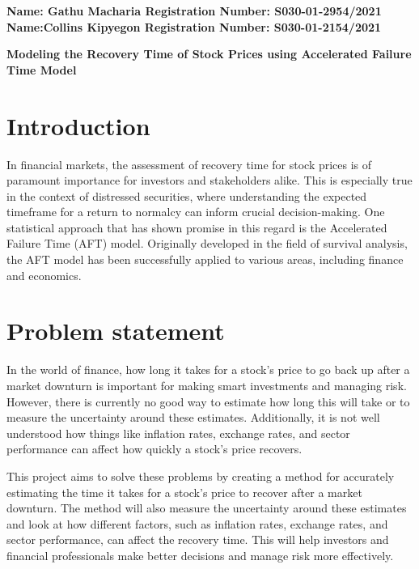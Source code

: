\documentclass[twoside,a4paper,12pt]{article}
\begin{document}
	
	\begin{flushleft} 
			\large{\bf{Name: Gathu Macharia     Registration Number: S030-01-2954/2021\\
					   Name:Collins Kipyegon        Registration Number: S030-01-2154/2021\\}} \vspace*{0.75in}
	\end{flushleft}
	
	\begin{center} \Large{ \bf{Modeling the Recovery Time of Stock Prices using Accelerated Failure Time Model }} \end{center}	


\section*{Introduction}In financial markets, the assessment of recovery time for stock prices is of paramount importance for investors and stakeholders alike. This is especially true in the context of distressed securities, where understanding the expected timeframe for a return to normalcy can inform crucial decision-making. One statistical approach that has shown promise in this regard is the Accelerated Failure Time (AFT) model. Originally developed in the field of survival analysis, the AFT model has been successfully applied to various areas, including finance and economics.

\section*{Problem statement}In the world of finance, how long it takes for a stock's price to go back up after a market downturn is important for making smart investments and managing risk. However, there is currently no good way to estimate how long this will take or to measure the uncertainty around these estimates. Additionally, it is not well understood how things like inflation rates, exchange rates, and sector performance can affect how quickly a stock's price recovers.

\noindent This project aims to solve these problems by creating a method for accurately estimating the time it takes for a stock's price to recover after a market downturn. The method will also measure the uncertainty around these estimates and look at how different factors, such as inflation rates, exchange rates, and sector performance, can affect the recovery time. This will help investors and financial professionals make better decisions and manage risk more effectively.
\end{document}
